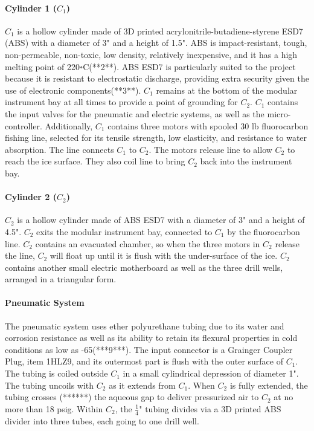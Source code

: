 \documentclass{article}
\begin{document}
\paragraph{Cylinder 1 ($C_1$)}

$C_1$ is a hollow cylinder made of 3D printed acrylonitrile-butadiene-styrene ESD7 (ABS) with a diameter of 3" and a height of 1.5". ABS is impact-resistant, tough, non-permeable, non-toxic, low density, relatively inexpensive, and it has a high melting point of 220॰C(**2**). ABS ESD7 is particularly suited to the project because it is resistant to electrostatic discharge, providing extra security given the use of electronic components(**3**). $C_1$ remains at the bottom of the modular instrument bay at all times to provide a point of grounding for $C_2$. $C_1$ contains the input valves for the pneumatic and electric systems, as well as the micro-controller. Additionally, $C_1$ contains three motors with spooled 30 lb fluorocarbon fishing line, selected for its tensile strength, low elasticity, and resistance to water absorption. The line connects $C_1$ to $C_2$. The motors release line to allow $C_2$ to reach the ice surface. They also coil line to bring $C_2$ back into the instrument bay.

\paragraph{Cylinder 2 ($C_2$)}
$C_2$ is a hollow cylinder made of ABS ESD7 with a diameter of 3" and a height of 4.5". $C_2$ exits the modular instrument bay, connected to $C_1$ by the fluorocarbon line. $C_2$ contains an evacuated chamber, so when the three motors in $C_2$ release the line, $C_2$ will float up until it is flush with the under-surface of the ice. $C_2$ contains another small electric motherboard as well as the three drill wells, arranged in a triangular form.

\paragraph{Pneumatic System}
The pneumatic system uses ether polyurethane tubing due to its water and corrosion resistance as well as its ability to retain its flexural properties in cold conditions as low as -65(***9***). The input connector is a Grainger Coupler Plug, item 1HLZ9, and its outermost part is flush with the outer surface of $C_1$. The tubing is coiled outside $C_1$ in a small cylindrical depression of diameter 1". The tubing uncoils with $C_2$ as it extends from $C_1$. When $C_2$ is fully extended, the tubing crosses (******) the aqueous gap to deliver pressurized air to $C_2$ at no more than 18 psig. Within $C_2$, the $\frac{1}{4}$" tubing divides via a 3D printed ABS divider into three tubes, each going to one drill well.
\end{document}
